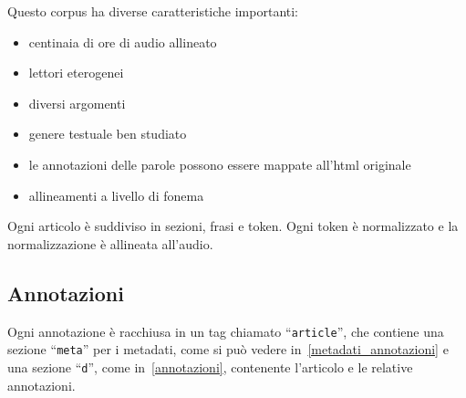 \documentclass[12pt,a4paper,titlepage]{article}
\begin{document}
Questo corpus ha diverse caratteristiche importanti:
\begin{itemize}
	\item centinaia di ore di audio allineato
	\item lettori eterogenei
	\item diversi argomenti
	\item genere testuale ben studiato
	\item le annotazioni delle parole possono essere mappate all'html originale
	\item allineamenti a livello di fonema
\end{itemize}

Ogni articolo è suddiviso in sezioni, frasi e token. Ogni token è normalizzato e la normalizzazione è allineata all'audio.

\subsection{Annotazioni}
Ogni annotazione è racchiusa in un tag chiamato ``\texttt{article}'', che contiene una sezione ``\texttt{meta}'' per i metadati, come si può vedere in~\ref{metadati_annotazioni} e una sezione ``\texttt{d}'', come in~\ref{annotazioni}, contenente l'articolo e le relative annotazioni.
\end{document}
